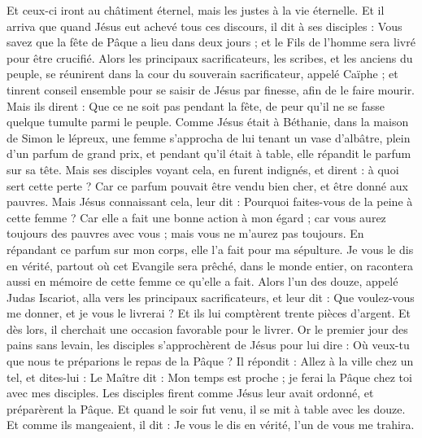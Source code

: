 \begin{multicols}{2}
Et ceux-ci iront au châtiment éternel, mais les justes à la vie éternelle.
\VerseOne{}Et il arriva que quand Jésus eut achevé tous ces discours, il dit à ses disciples :
Vous savez que la fête de Pâque a lieu dans deux jours ; et le Fils de l'homme sera livré pour être crucifié.
Alors les principaux sacrificateurs, les scribes, et les anciens du peuple, se réunirent dans la cour du souverain sacrificateur, appelé Caïphe ;
et tinrent conseil ensemble pour se saisir de Jésus par finesse, afin de le faire mourir.
Mais ils dirent : Que ce ne soit pas pendant la fête, de peur qu’il ne se fasse quelque tumulte parmi le peuple.
Comme Jésus était à Béthanie, dans la maison de Simon le lépreux,
une femme s’approcha de lui tenant un vase d'albâtre, plein d'un parfum de grand prix, et pendant qu’il était à table, elle répandit le parfum sur sa tête.
Mais ses disciples voyant cela, en furent indignés, et dirent : à quoi sert cette perte ?
Car ce parfum pouvait être vendu bien cher, et être donné aux pauvres.
Mais Jésus connaissant cela, leur dit : Pourquoi faites-vous de la peine à cette femme ? Car elle a fait une bonne action à mon égard ;
car vous aurez toujours des pauvres avec vous ; mais vous ne m'aurez pas toujours.
En répandant ce parfum sur mon corps, elle l'a fait pour ma sépulture.
Je vous le dis en vérité, partout où cet Evangile sera prêché, dans le monde entier, on racontera aussi en mémoire de cette femme ce qu’elle a fait.
Alors l'un des douze, appelé Judas Iscariot, alla vers les principaux sacrificateurs,
et leur dit : Que voulez-vous me donner, et je vous le livrerai ? Et ils lui comptèrent trente pièces d'argent.
Et dès lors, il cherchait une occasion favorable pour le livrer.
Or le premier jour des pains sans levain, les disciples s’approchèrent de Jésus pour lui dire : Où veux-tu que nous te préparions le repas de la Pâque ?
Il répondit : Allez à la ville chez un tel, et dites-lui : Le Maître dit : Mon temps est proche ; je ferai la Pâque chez toi avec mes disciples.
Les disciples firent comme Jésus leur avait ordonné, et préparèrent la Pâque.
Et quand le soir fut venu, il se mit à table avec les douze.
Et comme ils mangeaient, il dit : Je vous le dis en vérité, l'un de vous me trahira.

\end{multicols}
